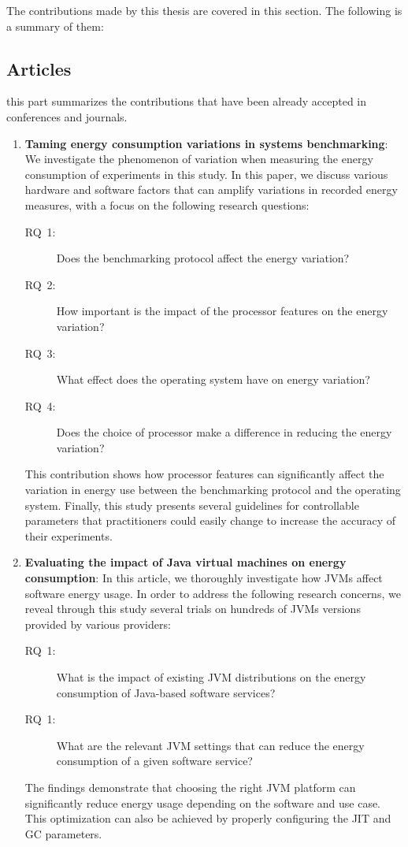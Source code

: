 The contributions made by this thesis are covered in this section. The following is a summary of them:

\subsection*{Articles}
this part summarizes the contributions that have been already accepted in conferences and journals.

\begin{enumerate}
      \item \textbf{Taming energy consumption variations in systems benchmarking}: We investigate the phenomenon of variation when measuring the energy consumption of experiments in this study. In this paper, we discuss various hardware and software factors that can amplify variations in recorded energy measures, with a focus on the following research questions:
            \begin{description}
                  \item[\textsc{RQ}~1:] Does the benchmarking protocol affect the energy variation?
                  \item[\textsc{RQ}~2:] How important is the impact of the processor features on the energy variation?
                  \item[\textsc{RQ}~3:] What effect does the operating system have on energy variation?
                  \item[\textsc{RQ}~4:] Does the choice of processor make a difference in reducing the energy variation?
            \end{description}

            This contribution shows how processor features can significantly affect the variation in energy use between the benchmarking protocol and the operating system. Finally, this study presents several guidelines for controllable parameters that practitioners could easily change to increase the accuracy of their experiments.



      \item \textbf{Evaluating the impact of Java virtual machines on energy consumption}: In this article, we thoroughly investigate how JVMs affect software energy usage. In order to address the following research concerns, we reveal through this study several trials on hundreds of JVMs versions provided by various providers:
            \begin{description}
                  \item[\textsc{RQ}~1:] What is the impact of existing JVM distributions on the energy consumption of Java-based software services?
                  \item [\textsc{RQ}~1:] What are the relevant JVM settings that can reduce the energy consumption of a given software service?
            \end{description}
            The findings demonstrate that choosing the right JVM platform can significantly reduce energy usage depending on the software and use case. This optimization can also be achieved by properly configuring the JIT and GC parameters.


\end{enumerate}
